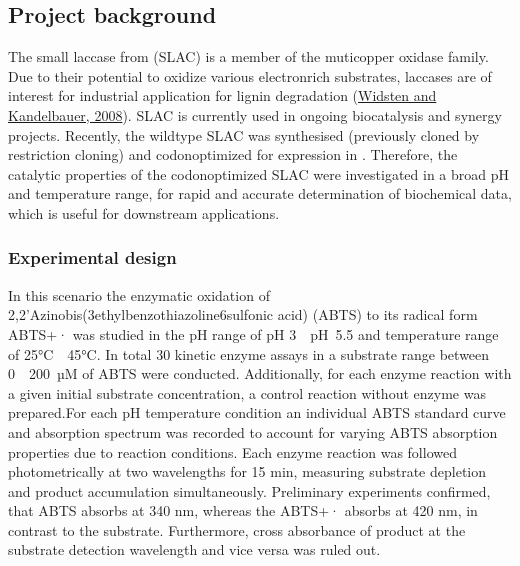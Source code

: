 \documentclass[letterpaper,12pt,english]{jupyterBook}
\begin{document}
\subsection{Project background}
\label{\detokenize{scenarios/SLAC_kinetic_characterization:project-background}}
\sphinxAtStartPar
The small laccase from  (SLAC) is a member of the muticopper oxidase family. Due to their potential to oxidize various electron\sphinxhyphen{}rich substrates, laccases are of interest for industrial application for lignin degradation (\hyperlink{cite.references:id13}{Widsten and Kandelbauer, 2008}). SLAC is currently used in ongoing biocatalysis and synergy projects. Recently, the wild\sphinxhyphen{}type SLAC was synthesised (previously cloned by restriction cloning) and codon\sphinxhyphen{}optimized for expression in . Therefore, the catalytic properties of the codon\sphinxhyphen{}optimized SLAC were investigated in a broad pH and temperature range, for rapid and accurate determination of biochemical data, which is useful for downstream applications.


\subsubsection{Experimental design}
\label{\detokenize{scenarios/SLAC_kinetic_characterization:experimental-design}}
\sphinxAtStartPar
In this scenario the enzymatic oxidation of 2,2’\sphinxhyphen{}Azino\sphinxhyphen{}bis(3\sphinxhyphen{}ethylbenzothiazoline\sphinxhyphen{}6\sphinxhyphen{}sulfonic acid) (ABTS) to its radical form ABTS+· was studied in the pH range of pH 3 \sphinxhyphen{} pH 5.5 and temperature range of 25°C \sphinxhyphen{} 45°C. In total 30 kinetic enzyme assays in a substrate range between 0 \sphinxhyphen{} 200 µM of ABTS were conducted. Additionally, for each enzyme reaction with a given initial substrate concentration, a control reaction without enzyme was prepared.For each pH \sphinxhyphen{} temperature condition an individual ABTS standard curve and absorption spectrum was recorded to account for varying ABTS absorption properties due to reaction conditions. Each enzyme reaction was followed photometrically at two wavelengths for 15 min, measuring substrate depletion and product accumulation simultaneously. Preliminary experiments confirmed, that ABTS absorbs at 340 nm, whereas the ABTS+· absorbs at 420 nm, in contrast to the substrate. Furthermore, cross absorbance of product at the substrate detection wavelength and vice versa was ruled out.
\end{document}
